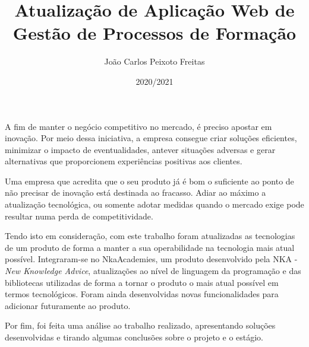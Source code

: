 \documentclass[a4paper,12pt,twoside]{book}
\title{Atualização de Aplicação Web de Gestão de Processos de Formação}
\author{João Carlos Peixoto Freitas}
\date{2020/2021}
\begin{document}
\frontmatter
\maketitle  %


\begin{resumo}

\par A fim de manter o negócio competitivo no mercado, é preciso apostar em inovação. Por meio dessa iniciativa, a empresa consegue criar soluções eficientes, minimizar o impacto de eventualidades, antever situações adversas e gerar alternativas que proporcionem experiências positivas aos clientes.
\par Uma empresa que acredita que o seu produto já é bom o suficiente ao ponto de não precisar de inovação está destinada ao fracasso. Adiar ao máximo a atualização tecnológica, ou somente adotar medidas quando o mercado exige pode resultar numa perda de competitividade.
\par Tendo isto em consideração, com este trabalho foram atualizadas as tecnologias de um produto de forma a manter a sua operabilidade na tecnologia mais atual possível. Integraram-se no NkaAcademies, um produto desenvolvido pela NKA - \textit{New Knowledge Advice}, atualizações ao nível de linguagem da programação e das bibliotecas utilizadas de forma a tornar o produto o mais atual possível em termos tecnológicos. Foram ainda desenvolvidas novas funcionalidades para adicionar futuramente ao produto.
\par Por fim, foi feita uma análise ao trabalho realizado, apresentando soluções desenvolvidas e tirando algumas conclusões sobre o projeto e o estágio.

\end{resumo}
\end{document}
